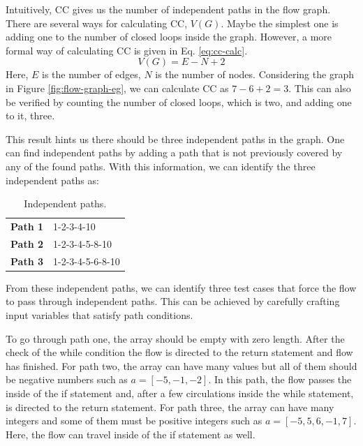 Intuitively, CC gives us the number of independent paths in the flow graph. There are several ways for calculating CC, $V(G)$. Maybe the simplest one is adding one to the number of closed loops inside the graph. However, a more formal way of calculating CC is given in Eq. \ref{eq:cc-calc}.
\begin{equation}
\label{eq:cc-calc}
    V(G) = E - N + 2
\end{equation}
Here, $E$ is the number of edges, $N$ is the number of nodes. Considering the graph in Figure \ref{fig:flow-graph-eg}, we can calculate CC as $7 - 6 + 2 = 3$. This can also be verified by counting the number of closed loops, which is two, and adding one to it, three.

This result hints us there should be three independent paths in the graph. One can find independent paths by adding a path that is not previously covered by any of the found paths. With this information, we can identify the three independent paths as:

\begin{table}[H]
    \centering
    \renewcommand{\arraystretch}{1.2}
    \caption{Independent paths.}
    \label{tab:independent-paths}
    \begin{tabular}{p{}p{}}
        \toprule
        \textbf{Path 1} & 1-2-3-4-10\\
        \textbf{Path 2} & 1-2-3-4-5-8-10\\
        \textbf{Path 3} & 1-2-3-4-5-6-8-10\\
        \bottomrule
    \end{tabular}
\end{table}

From these independent paths, we can identify three test cases that force the flow to pass through independent paths. This can be achieved by carefully crafting input variables that satisfy path conditions.

To go through path one, the array should be empty with zero length. After the check of the while condition the flow is directed to the return statement and flow has finished. For path two, the array can have many values but all of them should be negative numbers such as $a = [-5, -1, -2]$. In this path, the flow passes the inside of the if statement and, after a few circulations inside the while statement, is directed to the return statement. For path three, the array can have many integers and some of them must be positive integers such as $a = [-5, 5, 6, -1, 7]$. Here, the flow can travel inside of the if statement as well.

